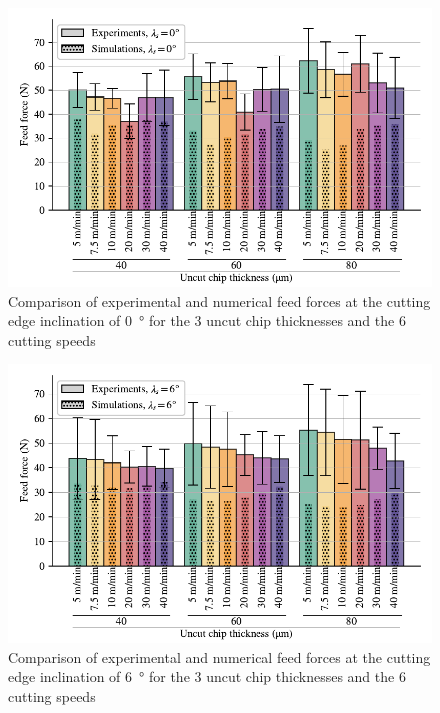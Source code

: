 \documentclass[preprint,12pt,times]{elsarticle}
\begin{document}
\begin{figure}[!h]
\centering
\includegraphics[width = 140 mm]{Figures/Fy_0}
\caption{Comparison of experimental and numerical feed forces at the cutting edge inclination of \qty{0}{\degree} for the 3 uncut chip thicknesses and the 6 cutting speeds}
\label{fig:Fy_0}
\end{figure}

\begin{figure}[!h]
\centering
\includegraphics[width = 140 mm]{Figures/Fy_6}
\caption{Comparison of experimental and numerical feed forces at the cutting edge inclination of \qty{6}{\degree} for the 3 uncut chip thicknesses and the 6 cutting speeds}
\label{fig:Fy_6}
\end{figure}
\end{document}
